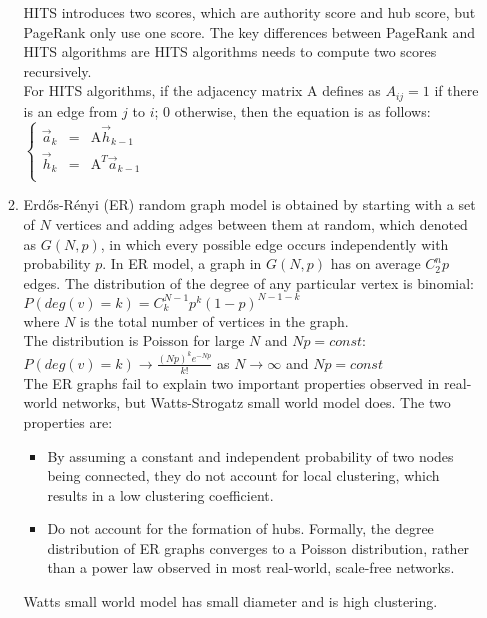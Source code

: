 \documentclass[10pt, a4paper]{article}
\begin{document}
\begin{enumerate}
\begin{enumerate}
        HITS introduces two scores, which are authority score and hub score, but PageRank only use one score. The key differences between PageRank and HITS algorithms are HITS algorithms needs to compute two scores recursively.\\
        For HITS algorithms, if the adjacency matrix A defines as $A_{ij} = 1$ if there is an edge from $j$ to $i$; 0 otherwise, then the equation is as follows:\\
        $\left\{
            \begin{array}{lll}
                \vec{a}_k & = & \mbox{A}\vec{h}_{k-1}\\
                \vec{h}_k & = & \mbox{A}^T\vec{a}_{k-1}\\
            \end{array}
        \right.$\\
    \item\mbox{}
        Erd{\H o}s-R{\' e}nyi (ER) random graph model is obtained by starting with a set of $N$ vertices and adding adges between them at random, which denoted as $G\left(N, p\right)$, in which every possible edge occurs independently with probability $p$. In ER model, a graph in $G\left(N, p\right)$ has on average $C_2^{n}p$ edges. The distribution of the degree of any particular vertex is binomial:\\
        $P\left(deg\left(v\right) = k\right) = C_k^{N-1}p^k\left(1 - p\right)^{N-1-k}$\\
        where $N$ is the total number of vertices in the graph.\\
        The distribution is Poisson for large $N$ and $Np = const$:\\
        $P\left(deg\left(v\right) = k\right) \rightarrow \frac{\left(Np\right)^ke^{-Np}}{k!}$ as $N \rightarrow \infty$ and $Np = const$\\

        The ER graphs fail to explain two important properties observed in real-world networks, but Watts-Strogatz small world model does. The two properties are:
        \begin{itemize}
        \item By assuming a constant and independent probability of two nodes being connected, they do not account for local clustering, which results in a low clustering coefficient.
        \item Do not account for the formation of hubs. Formally, the degree distribution of ER graphs converges to a Poisson distribution, rather than a power law observed in most real-world, scale-free networks.
        \end{itemize}
        Watts small world model has small diameter and is high clustering.\\


\end{enumerate}
\end{enumerate}
\end{document}
